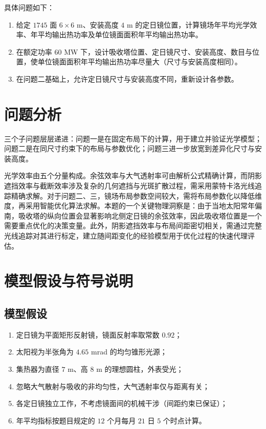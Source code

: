 \documentclass[12pt]{ctexart}
\begin{document}
具体问题如下：
\begin{enumerate}
\item 给定 $1745$ 面 $6\times6$ m、安装高度 $4$ m 的定日镜位置，计算镜场年平均光学效率、年平均输出热功率及单位镜面面积年平均输出热功率。
\item 在额定功率 $60$ MW 下，设计吸收塔位置、定日镜尺寸、安装高度、数目与位置，使单位镜面面积年平均输出热功率尽量大（尺寸与安装高度相同）。
\item 在问题二基础上，允许定日镜尺寸与安装高度不同，重新设计各参数。
\end{enumerate}

\section{问题分析}
三个子问题层层递进：问题一是在固定布局下的计算，用于建立并验证光学模型；问题二是在同尺寸约束下的布局与参数优化；问题三进一步放宽到差异化尺寸与安装高度。

光学效率由五个分量构成。余弦效率与大气透射率可由解析公式精确计算，而阴影遮挡效率与截断效率涉及复杂的几何遮挡与光斑扩散过程，需采用蒙特卡洛光线追踪精确求解。对于问题二、三，镜场布局参数空间较大，需将布局参数化以降低维度，再采用智能优化算法求解。本题的一个关键物理洞察是：由于当地太阳常年偏南，吸收塔的纵向位置会显著影响北侧定日镜的余弦效率，因此吸收塔位置是一个需要重点优化的决策变量。此外，阴影遮挡效率与布局间距密切相关，需通过完整光线追踪对其进行标定，建立随间距变化的经验模型用于优化过程的快速代理评估。

\section{模型假设与符号说明}
\subsection{模型假设}
\begin{enumerate}
\item 定日镜为平面矩形反射镜，镜面反射率取常数 $0.92$；
\item 太阳视为半张角为 $4.65$ mrad 的均匀锥形光源；
\item 集热器为直径 $7$ m、高 $8$ m 的理想圆柱，外表受光；
\item 忽略大气散射与吸收的非均匀性，大气透射率仅与距离有关；
\item 各定日镜独立工作，不考虑镜面间的机械干涉（间距约束已保证）；
\item 年平均指标按题目规定的 $12$ 个月每月 $21$ 日 $5$ 个时点计算。
\end{enumerate}
\end{document}
